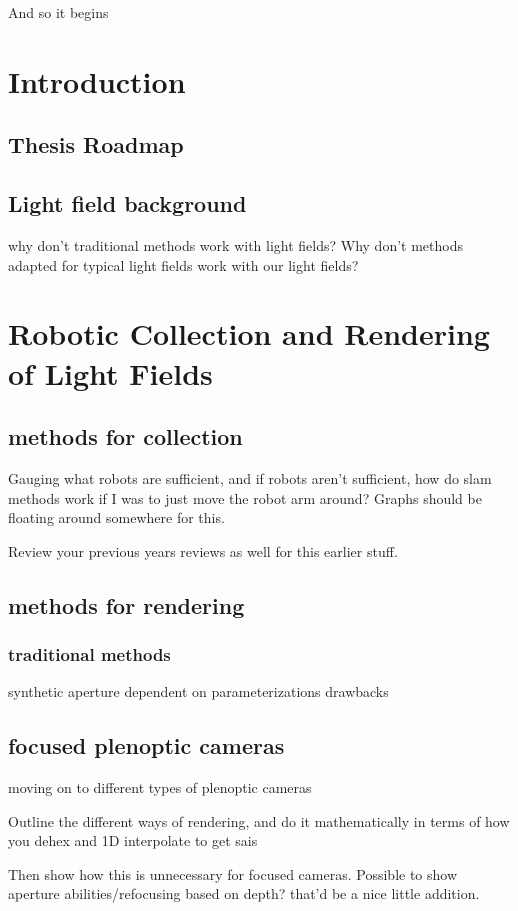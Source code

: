 \documentclass[12pt]{report}
\begin{document}
And so it begins

\chapter{Introduction}

\section{Thesis Roadmap}
\section{Light field background}

why don't traditional methods work with light fields?
Why don't methods adapted for typical light fields work with our light fields?

\chapter{Robotic Collection and Rendering of Light Fields}
\section{methods for collection}
Gauging what robots are sufficient, and if robots aren't sufficient, how do slam methods work if I was to just move the robot arm around?
Graphs should be floating around somewhere for this.

Review your previous years reviews as well for this earlier stuff.
\section{methods for rendering}
\subsection{traditional methods}
synthetic aperture dependent on parameterizations
drawbacks

\section{focused plenoptic cameras}
moving on to different types of plenoptic cameras

Outline the different ways of rendering, and do it mathematically in terms of how you dehex and 1D interpolate to get sais

Then show how this is unnecessary for focused cameras.
Possible to show aperture abilities/refocusing based on depth? that'd be a nice little addition.
\end{document}
